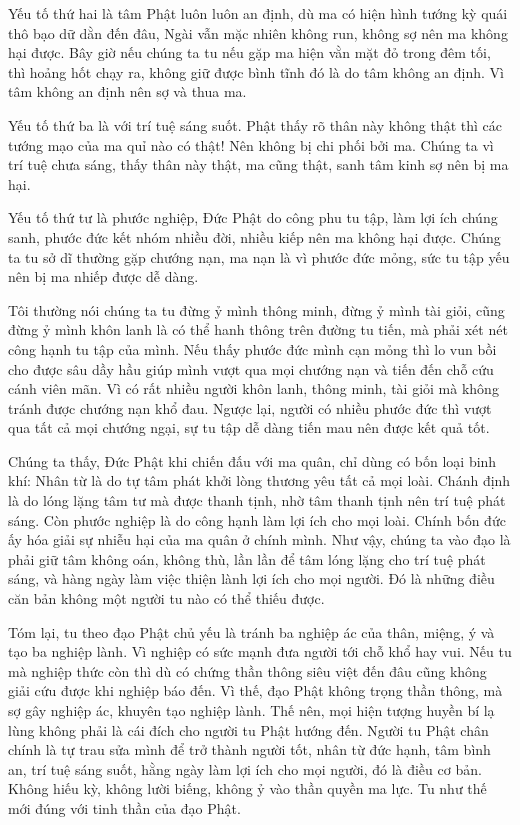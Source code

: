 \documentclass[
  12pt,
  oneside]{book}
\begin{document}
Yếu tố thứ hai là tâm Phật luôn luôn an định, dù ma có hiện hình tướng kỳ quái thô bạo dữ dằn đến đâu, Ngài vẫn mặc nhiên không run, không sợ nên ma không hại được. Bây giờ nếu chúng ta tu nếu gặp ma hiện vằn mặt đỏ trong đêm tối, thì hoảng hốt chạy ra, không giữ được bình tĩnh đó là do tâm không an định. Vì tâm không an định nên sợ và thua ma.

Yếu tố thứ ba là với trí tuệ sáng suốt. Phật thấy rõ thân này không thật thì các tướng mạo của ma quỉ nào có thật! Nên không bị chi phối bởi ma. Chúng ta vì trí tuệ chưa sáng, thấy thân này thật, ma cũng thật, sanh tâm kinh sợ nên bị ma hại.

Yếu tố thứ tư là phước nghiệp, Đức Phật do công phu tu tập, làm lợi ích chúng sanh, phước đức kết nhóm nhiều đời, nhiều kiếp nên ma không hại được. Chúng ta tu sở dĩ thường gặp chướng nạn, ma nạn là vì phước đức mỏng, sức tu tập yếu nên bị ma nhiếp được dễ dàng.

Tôi thường nói chúng ta tu đừng ỷ mình thông minh, đừng ỷ mình tài giỏi, cũng đừng ỷ mình khôn lanh là có thể hanh thông trên đường tu tiến, mà phải xét nét công hạnh tu tập của mình. Nếu thấy phước đức mình cạn mỏng thì lo vun bồi cho được sâu dầy hầu giúp mình vượt qua mọi chướng nạn và tiến đến chỗ cứu cánh viên mãn. Vì có rất nhiều người khôn lanh, thông minh, tài giỏi mà không tránh được chướng nạn khổ đau. Ngược lại, người có nhiều phước đức thì vượt qua tất cả mọi chướng ngại, sự tu tập dễ dàng tiến mau nên được kết quả tốt.

Chúng ta thấy, Đức Phật khi chiến đấu với ma quân, chỉ dùng có bốn loại binh khí: Nhân từ là do tự tâm phát khởi lòng thương yêu tất cả mọi loài. Chánh định là do lóng lặng tâm tư mà được thanh tịnh, nhờ tâm thanh tịnh nên trí tuệ phát sáng. Còn phước nghiệp là do công hạnh làm lợi ích cho mọi loài. Chính bốn đức ấy hóa giải sự nhiễu hại của ma quân ở chính mình. Như vậy, chúng ta vào đạo là phải giữ tâm không oán, không thù, lần lần để tâm lóng lặng cho trí tuệ phát sáng, và hàng ngày làm việc thiện lành lợi ích cho mọi người. Đó là những điều căn bản không một người tu nào có thể thiếu được.

Tóm lại, tu theo đạo Phật chủ yếu là tránh ba nghiệp ác của thân, miệng, ý và tạo ba nghiệp lành. Vì nghiệp có sức mạnh đưa người tới chỗ khổ hay vui. Nếu tu mà nghiệp thức còn thì dù có chứng thần thông siêu việt đến đâu cũng không giải cứu được khi nghiệp báo đến. Vì thế, đạo Phật không trọng thần thông, mà sợ gây nghiệp ác, khuyên tạo nghiệp lành. Thế nên, mọi hiện tượng huyền bí lạ lùng không phải là cái đích cho người tu Phật hướng đến. Người tu Phật chân chính là tự trau sửa mình để trở thành người tốt, nhân từ đức hạnh, tâm bình an, trí tuệ sáng suốt, hằng ngày làm lợi ích cho mọi người, đó là điều cơ bản. Không hiếu kỳ, không lười biếng, không ỷ vào thần quyền ma lực. Tu như thế mới đúng với tinh thần của đạo Phật.
\end{document}
